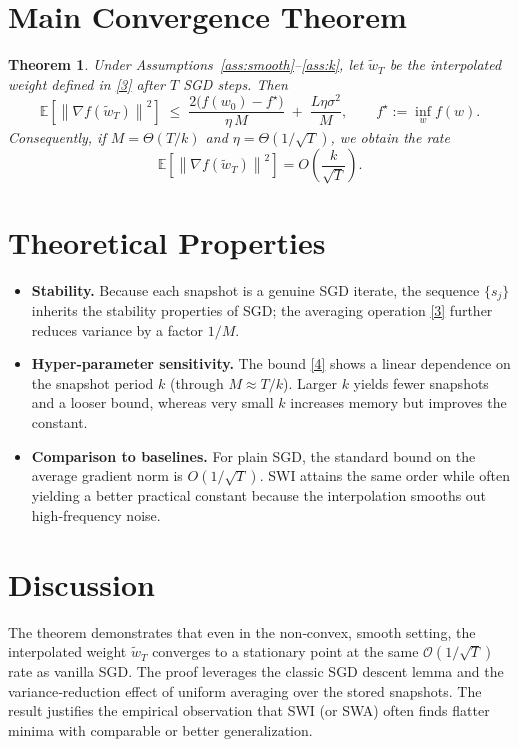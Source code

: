 \documentclass{article}
\newtheorem{theorem}{Theorem}
\newcommand{\E}{\mathbb{E}}
\newcommand{\norm}[1]{\left\|#1\right\|}
\begin{document}
\section*{Main Convergence Theorem}
\begin{theorem}\label{thm:main}
Under Assumptions~\ref{ass:smooth}–\ref{ass:k}, let $\tilde w_T$ be the interpolated weight defined in \eqref{3} after $T$ SGD steps. Then
\[
\E\!\left[\norm{\nabla f(\tilde w_T)}^2\right]
\;\le\;
\frac{2\big(f(w_0)-f^\star\big)}{\eta\,M}
\;+\;
\frac{L\eta\sigma^2}{M},
\qquad f^\star:=\inf_{w} f(w).
\tag{4}
\]
Consequently, if $M=\Theta(T/k)$ and $\eta=\Theta(1/\sqrt{T})$, we obtain the rate
\[
\E\!\left[\norm{\nabla f(\tilde w_T)}^2\right]=O\!\left(\frac{k}{\sqrt{T}}\right).
\]
\end{theorem}

\section*{Theoretical Properties}
\begin{itemize}
\item \textbf{Stability.} Because each snapshot is a genuine SGD iterate, the sequence $\{s_j\}$ inherits the stability properties of SGD; the averaging operation \eqref{3} further reduces variance by a factor $1/M$.
\item \textbf{Hyper‑parameter sensitivity.} The bound \eqref{4} shows a linear dependence on the snapshot period $k$ (through $M\approx T/k$). Larger $k$ yields fewer snapshots and a looser bound, whereas very small $k$ increases memory but improves the constant.
\item \textbf{Comparison to baselines.} For plain SGD, the standard bound on the average gradient norm is $O(1/\sqrt{T})$. SWI attains the same order while often yielding a better practical constant because the interpolation smooths out high‑frequency noise.
\end{itemize}

\section*{Discussion}
The theorem demonstrates that even in the non‑convex, smooth setting, the interpolated weight $\tilde w_T$ converges to a stationary point at the same $\mathcal{O}(1/\sqrt{T})$ rate as vanilla SGD. The proof leverages the classic SGD descent lemma and the variance‑reduction effect of uniform averaging over the stored snapshots. The result justifies the empirical observation that SWI (or SWA) often finds flatter minima with comparable or better generalization.
\end{document}
